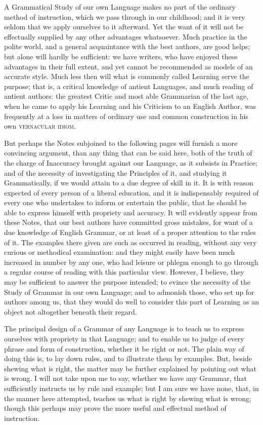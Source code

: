 A Grammatical Study of our own Language makes no part of the ordinary
method of instruction, which we pass through in our childhood; and it is
very seldom that we apply ourselves to it afterward. Yet the want of it
will not be effectually supplied by any other advantages whatsoever.
Much practice in the polite world, and a general acquaintance with the
best authors, are good helps; but alone will hardly be sufficient: we
have writers, who have enjoyed these advantages in their full extent,
and yet cannot be recommended as models of an accurate style. Much less
then will what is commonly called Learning serve the purpose; that is, a
critical knowledge of antient Languages, and much reading of antient
authors: the greatest Critic and most able Grammarian of the last age,
when he came to apply his Learning and his Criticism to an English
Author, was frequently at a loss in matters of ordinary use and common
construction in his own \textsc{vernacular idiom}.

But perhaps the Notes subjoined to the following pages will furnish a
more convincing argument, than any thing that can be said here, both of
the truth of the charge of Inaccuracy brought against our Language, as
it subsists in Practice; and of the necessity of investigating the
Principles of it, and studying it Grammatically, if we would attain to a
due degree of skill in it. It is with reason expected of every person of
a liberal education, and it is indispensably required of every one who
undertakes to inform or entertain the public, that he should be able to
express himself with propriety and accuracy. It will evidently appear
from these Notes, that our best authors have committed gross mistakes,
for want of a due knowledge of English Grammar, or at least of a proper
attention to the rules of it. The examples there given are such as
occurred in reading, without any very curious or methodical examination:
and they might easily have been much increased in number by any one, who
had leisure or phlegm enough to go through a regular course of reading
with this particular view. However, I believe, they may be sufficient to
answer the purpose intended; to evince the necessity of the Study of
Grammar in our own Language; and to admonish those, who set up for
authors among us, that they would do well to consider this part of
Learning as an object not altogether beneath their regard.

The principal design of a Grammar of any Language is to teach us to
express ourselves with propriety in that Language; and to enable us to
judge of every phrase and form of construction, whether it be right or
not. The plain way of doing this is, to lay down rules, and to
illustrate them by examples. But, beside shewing what is right, the
matter may be further explained by pointing out what is wrong. I will
not take upon me to say, whether we have any Grammar, that sufficiently
instructs us by rule and example; but I am sure we have none, that, in
the manner here attempted, teaches us what is right by shewing what is
wrong; though this perhaps may prove the more useful and effectual
method of instruction.

